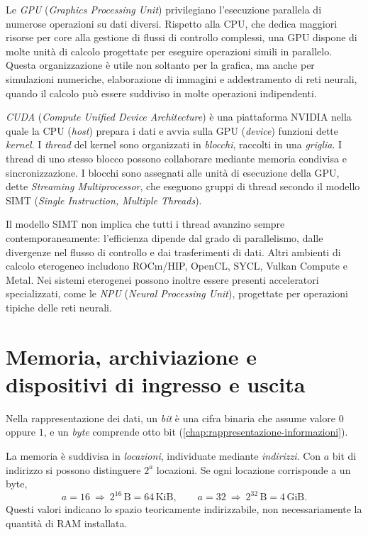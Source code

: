 Le \emph{GPU} (\emph{Graphics Processing Unit}) privilegiano
l'esecuzione parallela di numerose operazioni su dati diversi.
Rispetto alla CPU, che dedica maggiori risorse per core alla gestione
di flussi di controllo complessi, una GPU dispone di molte unità
di calcolo progettate per eseguire operazioni simili in parallelo.
Questa organizzazione è utile non soltanto per la grafica, ma anche
per simulazioni numeriche, elaborazione di immagini e addestramento
di reti neurali, quando il calcolo può essere suddiviso in molte
operazioni indipendenti.

\emph{CUDA} (\emph{Compute Unified Device Architecture}) è una
piattaforma NVIDIA nella quale la CPU (\emph{host}) prepara i dati
e avvia sulla GPU (\emph{device}) funzioni dette \emph{kernel}.
I \emph{thread} del kernel sono organizzati in \emph{blocchi},
raccolti in una \emph{griglia}. I thread di uno stesso blocco
possono collaborare mediante memoria condivisa e sincronizzazione.
I blocchi sono assegnati alle unità di esecuzione della GPU,
dette \emph{Streaming Multiprocessor}, che eseguono gruppi di thread
secondo il modello SIMT (\emph{Single Instruction, Multiple Threads}).

Il modello SIMT non implica che tutti i thread avanzino sempre
contemporaneamente: l'efficienza dipende dal grado di parallelismo,
dalle divergenze nel flusso di controllo e dai trasferimenti di dati.
Altri ambienti di calcolo eterogeneo includono ROCm/HIP, OpenCL,
SYCL, Vulkan Compute e Metal. Nei sistemi eterogenei possono inoltre
essere presenti acceleratori specializzati, come le \emph{NPU}
(\emph{Neural Processing Unit}), progettate per operazioni tipiche
delle reti neurali.

\section{Memoria, archiviazione e dispositivi di ingresso e uscita}
\label{sec:fi-memoria-archiviazione}

Nella rappresentazione dei dati, un \emph{bit} è una cifra binaria
che assume valore \(0\) oppure \(1\), e un \emph{byte} comprende otto
bit (\cref{chap:rappresentazione-informazioni}).

La memoria è suddivisa in \emph{locazioni}, individuate mediante
\emph{indirizzi}. Con \(a\) bit di indirizzo si possono distinguere
\(2^a\) locazioni. Se ogni locazione corrisponde a un byte,
\[
  a=16\ \Longrightarrow\ 2^{16}\,\mathrm{B}=64\,\mathrm{KiB},
  \qquad
  a=32\ \Longrightarrow\ 2^{32}\,\mathrm{B}=4\,\mathrm{GiB}.
\]
Questi valori indicano lo spazio teoricamente indirizzabile,
non necessariamente la quantità di RAM installata.

